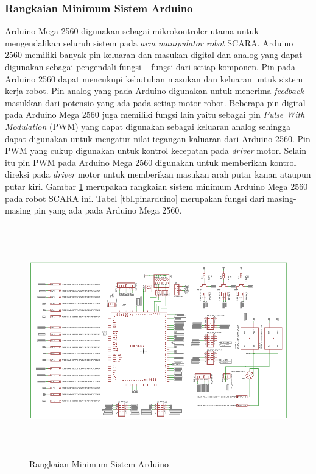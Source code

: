 \subsubsection{Rangkaian Minimum Sistem Arduino}
Arduino Mega 2560 digunakan sebagai mikrokontroler utama untuk mengendalikan seluruh sistem pada \textit{arm manipulator robot} SCARA. Arduino  2560 memiliki banyak pin keluaran dan masukan digital dan analog yang dapat digunakan sebagai pengendali fungsi – fungsi dari setiap komponen. Pin pada Arduino  2560 dapat mencukupi kebutuhan masukan dan keluaran untuk sistem kerja robot. Pin analog yang pada Arduino  digunakan untuk menerima \textit{feedback} masukkan dari potensio yang ada pada setiap motor robot. Beberapa pin digital pada Arduino Mega 2560 juga  memiliki fungsi lain yaitu sebagai pin \textit{Pulse With Modulation} (PWM) yang dapat digunakan sebagai keluaran analog sehingga dapat digunakan untuk mengatur nilai tegangan kaluaran dari Arduino  2560. Pin PWM yang cukup digunakan untuk kontrol kecepatan pada \textit{driver} motor. Selain itu pin PWM pada Arduino Mega 2560 digunakan untuk memberikan kontrol direksi pada \textit{driver} motor untuk memberikan masukan arah putar kanan ataupun putar kiri. Gambar \ref{pic.sisminarduino} merupakan rangkaian sistem minimum Arduino Mega 2560 pada robot SCARA ini. Tabel \ref{tbl.pinarduino} merupakan fungsi dari masing-masing pin yang ada pada Arduino Mega 2560.
\begin{figure}[H]
	\centering
	\includegraphics[width=15cm, height=10cm]{gambar/skematik1.png}
	\caption{Rangkaian Minimum Sistem Arduino}
	\label{pic.sisminarduino}
\end{figure}

